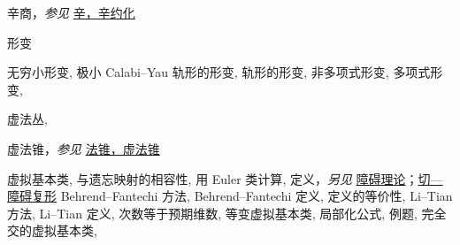 \begin{theindex}
\indexspace
\item \leavevmode\hypertarget{idx:1324}{辛商}，\textit{参见} \hyperlink{idx:1323}{辛，辛约化}
\indexspace
\item \leavevmode\hypertarget{idx:0208}{形变}
\subitem \leavevmode\hypertarget{idx:0209}{无穷小形变},\enspace{}
\subitem \leavevmode\hypertarget{idx:0210}{极小 Calabi--Yau 轨形的形变},\enspace{}
\subitem \leavevmode\hypertarget{idx:0211}{轨形的形变},\enspace{}
\subitem \leavevmode\hypertarget{idx:0212}{非多项式形变},\enspace{}
\subitem \leavevmode\hypertarget{idx:0213}{多项式形变},\enspace{}
\indexspace
\item \leavevmode\hypertarget{idx:1427}{虚法丛},\enspace{}
\indexspace
\item \leavevmode\hypertarget{idx:1428}{虚法锥}，\textit{参见} \hyperlink{idx:0951}{法锥，虚法锥}
\indexspace
\item \leavevmode\hypertarget{idx:1406}{虚拟基本类},\enspace{}
\subitem \leavevmode\hypertarget{idx:1407}{与遗忘映射的相容性},\enspace{}
\subitem \leavevmode\hypertarget{idx:1408}{用 Euler 类计算},\enspace{}
\subitem \leavevmode\hypertarget{idx:1409}{定义}，\textit{另见} \hyperlink{idx:0959}{障碍理论}；\hyperlink{idx:1328}{切—障碍复形}
\subsubitem \leavevmode\hypertarget{idx:1410}{Behrend--Fantechi 方法},\enspace{}
\subsubitem \leavevmode\hypertarget{idx:1411}{Behrend--Fantechi 定义},\enspace{}
\subsubitem \leavevmode\hypertarget{idx:1412}{定义的等价性},\enspace{}
\subsubitem \leavevmode\hypertarget{idx:1413}{Li--Tian 方法},\enspace{}
\subsubitem \leavevmode\hypertarget{idx:1414}{Li--Tian 定义},\enspace{}
\subitem \leavevmode\hypertarget{idx:1415}{次数等于预期维数},\enspace{}
\subitem \leavevmode\hypertarget{idx:1416}{等变虚拟基本类},\enspace{}
\subsubitem \leavevmode\hypertarget{idx:1417}{局部化公式},\enspace{}
\subitem \leavevmode\hypertarget{idx:1418}{例题},\enspace{}
\subitem \leavevmode\hypertarget{idx:1419}{完全交的虚拟基本类},\enspace{}

\end{theindex}
